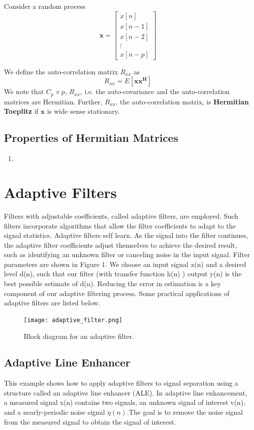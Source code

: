 Consider a random process \[
\pmb{x}=
  \begin{bmatrix}
    x[n] \\
    x[n-1] \\
    x[n-2] \\
    \vdots \\
    x[n-p]
  \end{bmatrix}
\]

We define the auto-correlation matrix $R_{xx}$ as $$ R_{xx} = E[\pmb{x}\pmb{x^H}]$$ 
We note that $C_p\times p$, $R_{xx}$, i.e. the auto-covariance and the auto-correlation matrices are Hermitian. Further, $R_{xx}$, the auto-correlation matrix, is \textbf{Hermitian Toeplitz} if $\pmb{x}$ is wide sense stationary.

\subsection{Properties of Hermitian Matrices}

\begin{enumerate}
\item
\end{enumerate}

\section{Adaptive Filters}

Filters with adjustable coefficients, called adaptive filters, are employed. Such filters incorporate algorithms that allow the filter coefficients to adapt to the signal statistics. Adaptive filters self learn. As the signal into the filter continues, the adaptive filter coefficients adjust themselves to achieve the desired result, such as identifying an unknown filter or canceling noise in the input signal. Filter parameters are shown in Figure 1. We choose an input signal x(n) and a desired level d(n), such that our filter (with transfer function h(n) ) output y(n) is the best possible estimate of d(n). Reducing the error in estimation is a key component of our adaptive filtering process.
Some practical applications of adaptive filters are listed below.
\begin{figure}[!ht]
\centering
\texttt{[image: adaptive\_filter.png]}
\caption{\label{fig:adaptive_filter}Block diagram for an adaptive filter.}
\end{figure}

\subsection{Adaptive Line Enhancer}
This example shows how to apply adaptive filters to signal separation using a structure called an adaptive line enhancer (ALE). In adaptive line enhancement, a measured signal x(n) contains two signals, an unknown signal of interest v(n), and a nearly-periodic noise signal $\eta(n)$.The goal is to remove the noise signal from the measured signal to obtain the signal of interest. 

